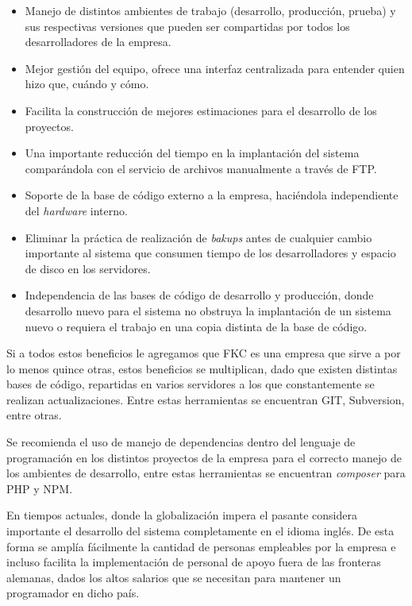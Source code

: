 \begin{itemize}
	\item Manejo de distintos ambientes de trabajo (desarrollo, producción, prueba) y sus respectivas versiones que pueden ser compartidas por todos los desarrolladores de la empresa.
	
	\item Mejor gestión del equipo, ofrece una interfaz centralizada para entender quien hizo que, cuándo y cómo.

	\item Facilita la construcción de mejores estimaciones para el desarrollo de los proyectos.

	\item Una importante reducción del tiempo en la implantación del sistema comparándola con el servicio de archivos manualmente a través de \gls{FTP}.

	\item Soporte de la base de código externo a la empresa, haciéndola independiente del \emph{hardware} interno.

	\item Eliminar la práctica de realización de \emph{bakups} antes de cualquier cambio importante al sistema que consumen tiempo de los desarrolladores y espacio de disco en los servidores.

	\item Independencia de las bases de código de desarrollo y producción, donde desarrollo nuevo para el sistema no obstruya la implantación de un sistema nuevo o requiera el trabajo en una copia distinta de la base de código.
\end{itemize}

Si a todos estos beneficios le agregamos que \gls{FKC} es una empresa que sirve a por lo menos quince otras, estos beneficios se multiplican, dado que existen distintas bases de código, repartidas en varios servidores a los que constantemente se realizan actualizaciones. Entre estas herramientas se encuentran GIT, Subversion, entre otras.

Se recomienda el uso de manejo de dependencias dentro del lenguaje de programación en los distintos proyectos de la empresa para el correcto manejo de los ambientes de desarrollo, entre estas herramientas se encuentran \emph{composer} para PHP y \gls{NPM}. 

En tiempos actuales, donde la globalización impera el pasante considera importante el desarrollo del sistema completamente en el idioma inglés. De esta forma se amplía fácilmente la cantidad de personas empleables por la empresa e incluso facilita la implementación de personal de apoyo fuera de las fronteras alemanas, dados los altos salarios que se necesitan para mantener un programador en dicho país.

